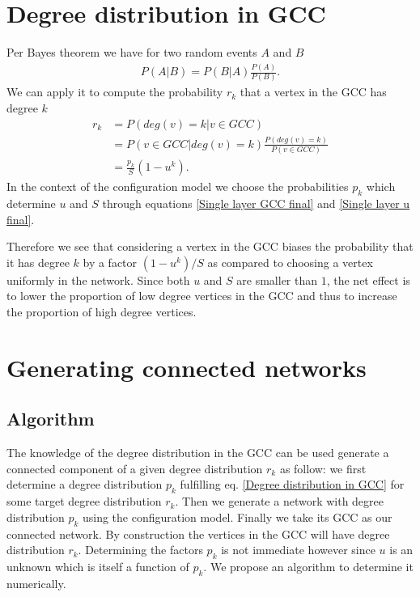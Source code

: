 \documentclass[
11pt, %
english, %
singlespacing, %
liststotoc, %
headsepline, %
]{MastersDoctoralThesis} %
\begin{document}
\newpage

\section{Degree distribution in GCC}
\label{Section: Degree distribution in the GCC}


Per Bayes theorem we have for two random events $A$ and $B$
\begin{align}
	P(A | B) = P(B | A) \frac{P(A)}{P(B)}. \label{Bayes theorem}
\end{align}
We can apply it to compute the probability $r_k$ that a vertex in the GCC has degree $k$
\begin{align}
	r_k &= P\left(deg(v) = k | v \in GCC\right)\\
	&= P(v \in GCC | deg(v) = k) \frac{P(deg(v) = k)}{P(v \in GCC)} \\
	&= \frac{p_k}{S} (1 - u^k). \label{Degree distribution in GCC}
\end{align}
In the context of the configuration model we choose the probabilities $p_k$ which determine $u$ and $S$ through equations \eqref{Single layer GCC final} and \eqref{Single layer u final}.

Therefore we see that considering a vertex in the GCC biases the probability that it has degree $k$ by a factor $(1 - u^k)/S$ as compared to choosing a vertex uniformly in the network. Since both $u$ and $S$ are smaller than $1$, the net effect is to lower the proportion of low degree vertices in the GCC and thus to increase the proportion of high degree vertices.

\section{Generating connected networks}
\label{Section: Generating connected networks}

\subsection{Algorithm}

The knowledge of the degree distribution in the GCC can be used generate a connected component of a given degree distribution $r_k$ as follow: we first determine a degree distribution $p_k$ fulfilling eq. \eqref{Degree distribution in GCC} for some target degree distribution $r_k$. Then we generate a network with degree distribution $p_k$ using the configuration model. Finally we take its GCC as our connected network. By construction the vertices in the GCC will have degree distribution $r_k$. Determining the factors $p_k$ is not immediate however since $u$ is an unknown which is itself a function of $p_k$. We propose an algorithm to determine it numerically.
\end{document}
